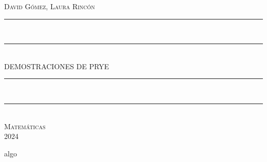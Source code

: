 \documentclass{article}
\newcommand*{\titleTMB}{\begingroup
\def\drop{0.1\textheight}
\centering
\vspace*{\baselineskip}
{\large\scshape David Gómez, Laura Rincón}\\[\baselineskip]
\rule{\textwidth}{1.6pt}\\[0pt]
\vspace*{-\baselineskip}
\vspace*{2pt}
\rule{\textwidth}{0.4pt}\\[\baselineskip]
{\LARGE DEMOSTRACIONES DE PRYE}\\[\baselineskip]
\rule{\textwidth}{0.4pt}\\[0pt]
\vspace*{-\baselineskip}\vspace{3.2pt}
\rule{\textwidth}{1.6pt}\\[\baselineskip]
\vfill
{\large\scshape Matemáticas}\\[\baselineskip]
{\small\scshape 2024}\par
\vspace*{\drop}
\endgroup}
\begin{document}
\begin{titlepage}
  \titleTMB
\end{titlepage}
\tableofcontents
\clearpage

algo
\end{document}
